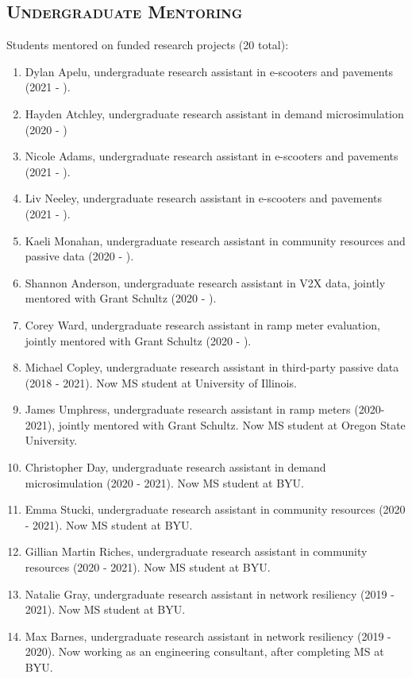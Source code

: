 \documentclass[margin,line]{res}
\newcounter{enuminitialize}
\newenvironment{myenum}[1][]
{%
 \setcounter{enuminitialize}{#1}
 \addtocounter{enuminitialize}{2}
 \begin{enumerate}[left= 4pt, itemsep=12pt, start=\value{enuminitialize}, label=\arabic*\addtocounter{enumi}{-2}]
}
{%
 \end{enumerate}
}
\newcommand{\secfont}{\scshape }
\begin{document}
\begin{resume}
\noindent\makebox[\linewidth]{\rule{\linewidth}{0.4pt}}
\section{\secfont Undergraduate Mentoring}

Students mentored on funded research projects (20 total):
\vspace{0.2cm}
\begin{myenum}[20]
  \item Dylan Apelu, undergraduate research assistant in e-scooters and pavements (2021 - ).
  \item Hayden Atchley, undergraduate research assistant in demand microsimulation (2020 - )
  \item Nicole Adams, undergraduate research assistant in e-scooters and pavements (2021 - ).
  \item Liv Neeley, undergraduate research assistant in e-scooters and pavements (2021 - ).
  \item Kaeli Monahan, undergraduate research assistant in community resources and passive data (2020 - ).
  \item Shannon Anderson, undergraduate research assistant in V2X data, jointly mentored with Grant Schultz (2020 - ).
  \item Corey Ward, undergraduate research assistant in ramp meter evaluation, jointly mentored with Grant Schultz (2020 - ).
  \item Michael Copley, undergraduate research assistant in third-party passive data (2018 - 2021). Now MS student at University of Illinois.
  \item James Umphress, undergraduate research assistant in ramp meters (2020-2021), jointly mentored with Grant Schultz. Now MS student at Oregon State University.
  \item Christopher Day, undergraduate research assistant in demand microsimulation (2020 - 2021). Now MS student at BYU.
  \item Emma Stucki, undergraduate research assistant in community resources (2020 - 2021). Now MS student at BYU.
  \item Gillian Martin Riches, undergraduate research assistant in community resources (2020 - 2021). Now MS student at BYU.
  \item Natalie Gray, undergraduate research assistant in network resiliency (2019 - 2021). Now MS student at BYU.
  \item Max Barnes, undergraduate research assistant in network resiliency (2019 - 2020). Now working as an engineering consultant, after completing MS at BYU.

\end{myenum}
\end{resume}
\end{document}
